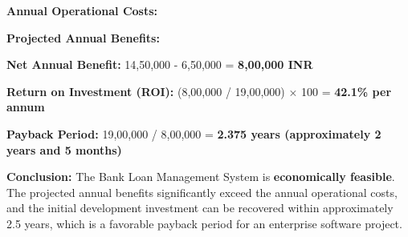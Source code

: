 \textbf{Annual Operational Costs:}

\begin{table}[htbp]
\centering
\small
{}
\end{table}

\textbf{Projected Annual Benefits:}

\begin{table}[htbp]
\centering
\small
{}
\end{table}

\textbf{Net Annual Benefit:} 14,50,000 - 6,50,000 = \textbf{8,00,000 INR}

\textbf{Return on Investment (ROI):} (8,00,000 / 19,00,000) × 100 = \textbf{42.1\% per annum}

\textbf{Payback Period:} 19,00,000 / 8,00,000 = \textbf{2.375 years (approximately 2 years and 5 months)}

\textbf{Conclusion:} The Bank Loan Management System is \textbf{economically feasible}. The projected annual benefits significantly exceed the annual operational costs, and the initial development investment can be recovered within approximately 2.5 years, which is a favorable payback period for an enterprise software project.

